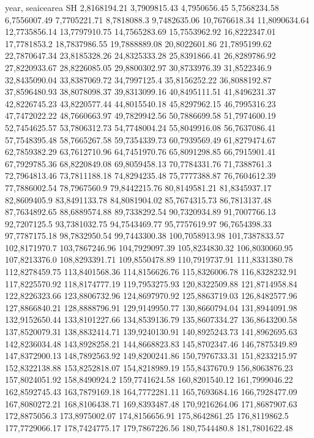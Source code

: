 year,    seaicearea SH
2,8168194.21
3,7909815.43
4,7950656.45
5,7568234.58
6,7556007.49
7,7705221.71
8,7818088.3
9,7482635.06
10,7676618.34
11,8090634.64
12,7735856.14
13,7797910.75
14,7565283.69
15,7553962.92
16,8222347.01
17,7781853.2
18,7837986.55
19,7888889.08
20,8022601.86
21,7895199.62
22,7870647.34
23,8185328.26
24,8325333.28
25,8391866.41
26,8289786.92
27,8220933.67
28,8226085.05
29,8800302.97
30,8733976.39
31,8522346.9
32,8435090.04
33,8387069.72
34,7997125.4
35,8156252.22
36,8088192.87
37,8596480.93
38,8078098.37
39,8313099.16
40,8495111.51
41,8496231.37
42,8226745.23
43,8220577.44
44,8015540.18
45,8297962.15
46,7995316.23
47,7472022.22
48,7660663.97
49,7829942.56
50,7886699.58
51,7974600.19
52,7454625.57
53,7806312.73
54,7748004.24
55,8049916.08
56,7637086.41
57,7548395.48
58,7665267.58
59,7354339.73
60,7939569.49
61,8279474.67
62,7859382.29
63,7612710.96
64,7451970.76
65,8091298.85
66,7915901.41
67,7929785.36
68,8220849.08
69,8059458.13
70,7784331.76
71,7388761.3
72,7964813.46
73,7811188.18
74,8294235.48
75,7777388.87
76,7604612.39
77,7886002.54
78,7967560.9
79,8442215.76
80,8149581.21
81,8345937.17
82,8609405.9
83,8491133.78
84,8081904.02
85,7674315.73
86,7813137.48
87,7634892.65
88,6889574.88
89,7338292.54
90,7320934.89
91,7007766.13
92,7207125.5
93,7381032.75
94,7543469.77
95,7757619.97
96,7654398.33
97,7787175.18
98,7832950.54
99,7443300.38
100,7058913.98
101,7387833.57
102,8171970.7
103,7867246.96
104,7929097.39
105,8234830.32
106,8030060.95
107,8213376.0
108,8293391.71
109,8550478.89
110,7919737.91
111,8331380.78
112,8278459.75
113,8401568.36
114,8156626.76
115,8326006.78
116,8328232.91
117,8225570.92
118,8174777.19
119,7953275.93
120,8322509.88
121,8714958.84
122,8226323.66
123,8806732.96
124,8697970.92
125,8863719.03
126,8482577.96
127,8866840.21
128,8888796.91
129,9149950.77
130,8660794.04
131,8944091.98
132,9152650.44
133,8101227.66
134,8539136.79
135,8607334.27
136,8643200.58
137,8520079.31
138,8832414.71
139,9240130.91
140,8925243.73
141,8962695.63
142,8236034.48
143,8928258.21
144,8668823.83
145,8702347.46
146,7875349.89
147,8372900.13
148,7892563.92
149,8200241.86
150,7976733.31
151,8233215.97
152,8322138.88
153,8252818.07
154,8218989.19
155,8437670.9
156,8063876.23
157,8024051.92
158,8490924.2
159,7741624.58
160,8201540.12
161,7999046.22
162,8592745.43
163,7879169.18
164,7772281.11
165,7693684.16
166,7928477.09
167,8080272.21
168,8106438.71
169,8393487.48
170,9216264.06
171,8687907.63
172,8875056.3
173,8975002.07
174,8156656.91
175,8642861.25
176,8119862.5
177,7729066.17
178,7424775.17
179,7867226.56
180,7544480.8
181,7801622.48

